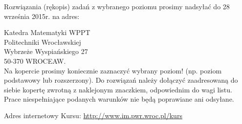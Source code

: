 \documentclass[10pt]{article}
\begin{document}
Rozwiązania (rękopis) zadań z wybranego poziomu prosimy nadsyłać do 28 września 2015r. na adres:

Katedra Matematyki WPPT\\
Politechniki Wrocławskiej\\
Wybrzeże Wyspiańskiego 27\\
50-370 WROCEAW.\\
Na kopercie prosimy koniecznie zaznaczyć wybrany poziom! (np. poziom podstawowy lub rozszerzony). Do rozwiązań należy dołączyć zaadresowaną do siebie kopertę zwrotną z naklejonym znaczkiem, odpowiednim do wagi listu. Prace niespełniające podanych warunków nie będą poprawiane ani odsyłane.

Adres internetowy Kursu: \href{http://www.im.pwr.wroc.pl/kurs}{http://www.im.pwr.wroc.pl/kurs}
\end{document}
